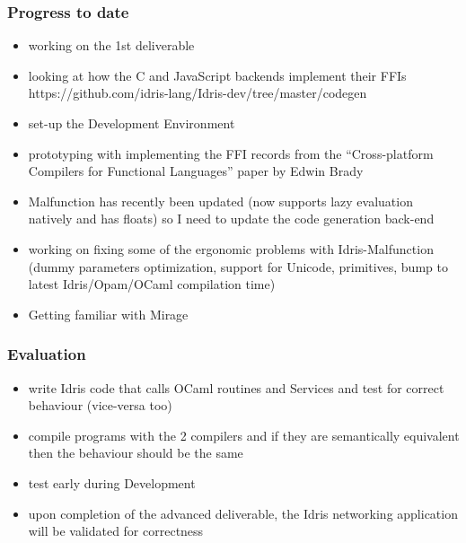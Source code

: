 \documentclass{beamer}
\begin{document}
\begin{frame}
	\frametitle{Progress to date}

	\begin{itemize}
		\item working on the 1st deliverable
		\item looking at how the C and JavaScript backends implement
		      their FFIs https://github.com/idris-lang/Idris-dev/tree/master/codegen
		\item set-up the Development Environment
		\item prototyping with implementing the FFI records from the
		      ``Cross-platform Compilers for Functional Languages'' paper
		      by Edwin Brady
		\item Malfunction has recently been updated (now supports
		      lazy evaluation natively and has floats) so I need
		      to update the code generation back-end
		\item working on fixing some of the ergonomic problems with
		      Idris-Malfunction (dummy parameters optimization, support for Unicode,
		      primitives, bump to latest Idris/Opam/OCaml compilation time)
		\item Getting familiar with Mirage
	\end{itemize}

\end{frame}


\begin{frame}
	\frametitle{Evaluation}

	\begin{itemize}
		\item write Idris code that calls OCaml routines and Services
		      and test for correct behaviour (vice-versa too)
		\item compile programs with the 2 compilers and if
		      they are semantically equivalent then the behaviour should
		      be the same
		\item test early during Development
		\item upon completion of the advanced deliverable,
		      the Idris networking application will be validated for
		      correctness
	\end{itemize}
\end{frame}
\end{document}
